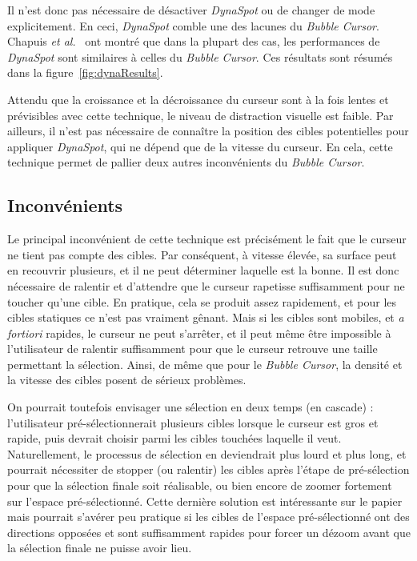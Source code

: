 	Il n'est donc pas nécessaire de désactiver \emph{DynaSpot} ou de changer de mode explicitement. En ceci, \emph{DynaSpot} comble une des lacunes du \emph{Bubble Cursor}. Chapuis \emph{et al.}~\cite{chapuis2009dynaspot} ont montré que dans la plupart des cas, les performances de \emph{DynaSpot} sont similaires à celles du \emph{Bubble Cursor}. Ces résultats sont résumés dans la figure~\ref{fig:dynaResults}.

	Attendu que la croissance et la décroissance du curseur sont à la fois lentes et prévisibles avec cette technique, le niveau de distraction visuelle est faible. Par ailleurs, il n'est pas nécessaire de connaître la position des cibles potentielles pour appliquer \emph{DynaSpot}, qui ne dépend que de la vitesse du curseur. En cela, cette technique permet de pallier deux autres inconvénients du \emph{Bubble Cursor}.

	\subsection{Inconvénients}
	Le principal inconvénient de cette technique est précisément le fait que le curseur ne tient pas compte des cibles. Par conséquent, à vitesse élevée, sa surface peut en recouvrir plusieurs, et il ne peut déterminer laquelle est la bonne. Il est donc nécessaire de ralentir et d'attendre que le curseur rapetisse suffisamment pour ne toucher qu'une cible. En pratique, cela se produit assez rapidement, et pour les cibles statiques ce n'est pas vraiment gênant. Mais si les cibles sont mobiles, et \emph{a fortiori} rapides, le curseur ne peut s'arrêter, et il peut même être impossible à l'utilisateur de ralentir suffisamment pour que le curseur retrouve une taille permettant la sélection. Ainsi, de même que pour le \emph{Bubble Cursor}, la densité et la vitesse des cibles posent de sérieux problèmes.

	On pourrait toutefois envisager une sélection en deux temps (en cascade) : l'utilisateur pré-sélectionnerait plusieurs cibles lorsque le curseur est gros et rapide, puis devrait choisir parmi les cibles touchées laquelle il veut. Naturellement, le processus de sélection en deviendrait plus lourd et plus long, et pourrait nécessiter de stopper (ou ralentir) les cibles après l'étape de pré-sélection pour que la sélection finale soit réalisable, ou bien encore de zoomer fortement sur l'espace pré-sélectionné. Cette dernière solution est intéressante sur le papier mais pourrait s'avérer peu pratique si les cibles de l'espace pré-sélectionné ont des directions opposées et sont suffisamment rapides pour forcer un \og dézoom \fg{} avant que la sélection finale ne puisse avoir lieu.
	
